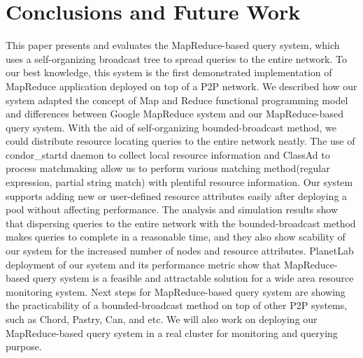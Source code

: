 \documentclass{acm_proc_article-sp}
\begin{document}
\section{Conclusions and Future Work}
This paper presents and evaluates the MapReduce-based query system, which uses a self-organizing broadcast tree to spread queries to the entire network.
To our best knowledge, this system is the first demonstrated implementation of MapReduce application deployed on top of a P2P network.
We described how our system adapted the concept of Map and Reduce functional programming model and differences between Google MapReduce system and our MapReduce-based query system.
With the aid of self-organizing bounded-broadcast method, we could distribute resource locating queries to the entire network neatly. 
The use of condor\_startd daemon to collect local resource information and ClassAd to process matchmaking allow us to perform various matching method(regular expression, partial string match) with plentiful resource information.
Our system supports adding new or user-defined resource attributes easily after deploying a pool without affecting performance.
The analysis and simulation results show that dispersing queries to the entire network with the bounded-broadcast method makes queries to complete in a reasonable time, 
and they also show scability of our system for the increased number of nodes and resource attributes.
PlanetLab deployment of our system and its performance metric show that MapReduce-based query system is a feasible and attractable solution for a wide area resource monitoring system.
Next steps for MapReduce-based query system are showing the practicability of a bounded-broadcast method on top of other P2P systems, such as Chord, Pastry, Can, and etc.
We will also work on deploying our MapReduce-based query system in a real cluster for monitoring and querying purpose.


\balancecolumns
\end{document}
